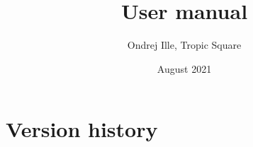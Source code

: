 \documentclass{tropic_design_spec}
\title{User manual}
\author{Ondrej Ille, Tropic Square}
\date{August 2021}
\begin{document}
\def \projectname {Tropic Square HW Simulation Scripting System}
\def \documentname {User manual}
\def \versionnumber {0.13}

\maketitle


\section*{Version history}
\end{document}
